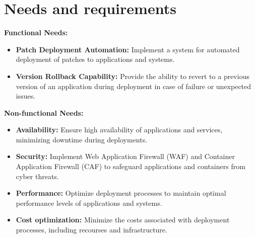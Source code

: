 \section{Needs and requirements}
\noindent
\textbf{Functional Needs:}
\begin{itemize}
    \item \textbf{Patch Deployment Automation:} Implement a system for automated deployment of patches to applications and systems.
    \item \textbf{Version Rollback Capability:} Provide the ability to revert to a previous version of an application during deployment in case of failure or unexpected issues.
\end{itemize}
\textbf{Non-functional Needs:}
\noindent
\begin{itemize}
    \item \textbf{Availability:} Ensure high availability of applications and services, minimizing downtime during deployments.
    \item \textbf{Security:} Implement Web Application Firewall (WAF) and Container Application Firewall (CAF) to safeguard applications and containers from cyber threats.
    \item \textbf{Performance:} Optimize deployment processes to maintain optimal performance levels of applications and systems.
    \item \textbf{Cost optimization:} Minimize the costs associated with deployment processes, including recourses and infrastructure.
\end{itemize}

